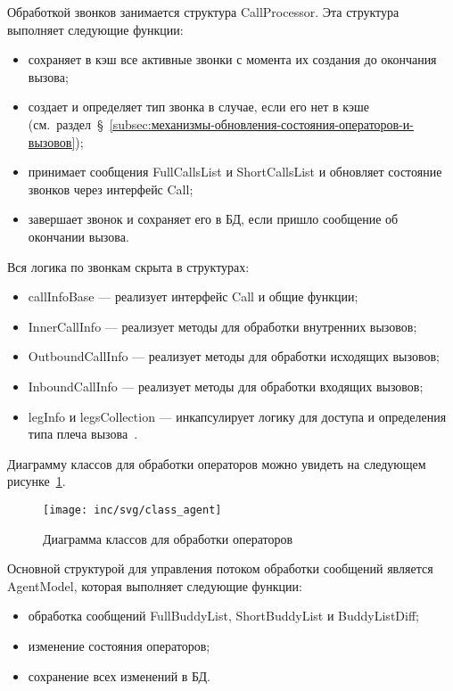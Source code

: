 Обработкой звонков занимается структура CallProcessor.
Эта структура выполняет следующие функции:
\begin{itemize}
    \item сохраняет в кэш все активные звонки с момента их создания до окончания вызова;
    \item создает и определяет тип звонка в случае, если его нет в кэше (см.~раздел~\S~\ref{subsec:механизмы-обновления-состояния-операторов-и-вызовов});
    \item принимает сообщения FullCallsList и ShortCallsList и обновляет состояние звонков через интерфейс Call;
    \item завершает звонок и сохраняет его в БД, если пришло сообщение об окончании вызова.
\end{itemize}

Вся логика по звонкам скрыта в структурах:
\begin{itemize}
    \item callInfoBase --- реализует интерфейс Call и общие функции;
    \item InnerCallInfo --- реализует методы для обработки внутренних вызовов;
    \item OutboundCallInfo --- реализует методы для обработки исходящих вызовов;
    \item InboundCallInfo --- реализует методы для обработки входящих вызовов;
    \item legInfo и legsCollection --- инкапсулирует логику для доступа и определения типа плеча вызова~\cite{doc:Call_Structure}.
\end{itemize}

Диаграмму классов для обработки операторов можно увидеть на следующем рисунке~\ref{pic:agent:uml-class}.

\begin{figure}[ht]
    \centering
    \texttt{[image: inc/svg/class\_agent]}
    \caption{Диаграмма классов для обработки операторов}
    \label{pic:agent:uml-class}
\end{figure}

Основной структурой для управления потоком обработки сообщений является AgentModel, которая выполняет следующие функции:
\begin{itemize}
    \item обработка сообщений FullBuddyList, ShortBuddyList и BuddyListDiff;
    \item изменение состояния операторов;
    \item сохранение всех изменений в БД.
\end{itemize}

